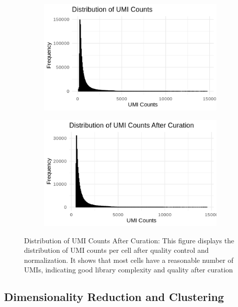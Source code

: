 \documentclass[runningheads]{llncs}
\begin{document}
\begin{figure}[H]
  \centering
  \begin{subfigure}[b]{0.45\textwidth}
    \centering
    \includegraphics[width=\textwidth]{000016.png}
    \label{fig:mito_umi_before}
  \end{subfigure}
  \hfill
  \begin{subfigure}[b]{0.45\textwidth}
    \centering
    \includegraphics[width=\textwidth]{000010.png}
    \label{fig:umi_counts}
  \end{subfigure}
  \caption{Distribution of UMI Counts After Curation: This figure displays the distribution of UMI counts per cell after quality control and normalization. It shows that most cells have a reasonable number of UMIs, indicating good library complexity and quality after curation}
  \label{fig:umi_distributions}
\end{figure}

\subsection*{Dimensionality Reduction and Clustering}
\end{document}
